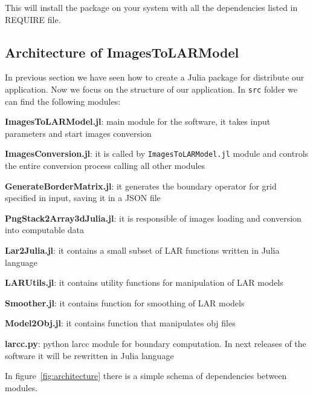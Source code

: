 \documentclass[11pt,oneside]{article}	%
\begin{document}
This will install the package on your system with all the dependencies listed in REQUIRE file. 

\subsection{Architecture of ImagesToLARModel}\label{sec:architecture}

In previous section we have seen how to create a Julia package for distribute our application. Now we focus on the structure of our application. In \texttt{src} folder we can find the following modules:

\begin{description}
 \item \textbf{ImagesToLARModel.jl}: main module for the software, it takes input parameters and start images conversion
 \item \textbf{ImagesConversion.jl}: it is called by \texttt{ImagesToLARModel.jl} module and controls the entire conversion process calling all other modules
 \item \textbf{GenerateBorderMatrix.jl}: it generates the boundary operator for grid specified in input, saving it in a JSON file
 \item \textbf{PngStack2Array3dJulia.jl}: it is responsible of images loading and conversion into computable data
 \item \textbf{Lar2Julia.jl}: it contains a small subset of LAR functions written in Julia language
 \item \textbf{LARUtils.jl}: it contains utility functions for manipulation of LAR models
 \item \textbf{Smoother.jl}: it contains function for smoothing of LAR models
 \item \textbf{Model2Obj.jl}: it contains function that manipulates obj files
 \item \textbf{larcc.py}: python larcc module for boundary computation. In next releases of the software it will be rewritten in Julia language
\end{description}

In figure~\ref{fig:architecture} there is a simple schema of dependencies between modules.
\end{document}
